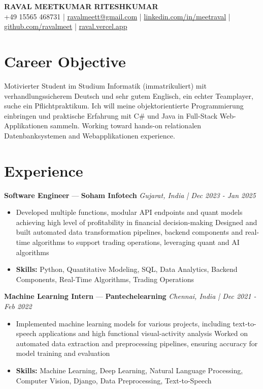 \documentclass[a4paper,10pt]{article}
\begin{document}
\begin{center}
  {\Large\bfseries RAVAL MEETKUMAR RITESHKUMAR}\\[2pt]
  {\small +49 15565 468731 \;|\; \href{mailto:ravalmeett@gmail.com}{ravalmeett@gmail.com} \;|\; \href{https://www.linkedin.com/in/meetraval/}{linkedin.com/in/meetraval} \;|\; \href{https://github.com/ravalmeet}{github.com/ravalmeet} \;|\; \href{https://raval.vercel.app/}{raval.vercel.app}}
\end{center}
\vspace{-3pt}

\section*{Career Objective}
Motivierter Student im Studium Informatik (immatrikuliert) mit verhandlungssicherem Deutsch und sehr gutem Englisch, ein echter Teamplayer, suche ein Pflichtpraktikum. Ich will meine objektorientierte Programmierung einbringen und praktische Erfahrung mit C\# und Java in Full-Stack Web-Applikationen sammeln. Working toward hands-on relationalen Datenbanksystemen and Webapplikationen experience.\par

\section*{Experience}
\textbf{Software Engineer} — \textbf{Soham Infotech} \hfill \textit{Gujarat, India \;|\; Dec 2023 - Jan 2025}\par
\vspace{1pt}
\begin{itemize}
  \item Developed multiple functions, modular API endpoints and quant models achieving high level of profitability in financial decision-making Designed and built automated data transformation pipelines, backend components and real-time algorithms to support trading operations, leveraging quant and AI algorithms
  \item \textbf{Skills:} Python, Quantitative Modeling, SQL, Data Analytics, Backend Components, Real-Time Algorithms, Trading Operations
\end{itemize}
\vspace{3pt}
\textbf{Machine Learning Intern} — \textbf{Pantechelearning} \hfill \textit{Chennai, India \;|\; Dec 2021 - Feb 2022}\par
\vspace{1pt}
\begin{itemize}
  \item Implemented machine learning models for various projects, including text-to-speech applications and high functional visual-activity analysis Worked on automated data extraction and preprocessing pipelines, ensuring accuracy for model training and evaluation
  \item \textbf{Skills:} Machine Learning, Deep Learning, Natural Language Processing, Computer Vision, Django, Data Preprocessing, Text-to-Speech
\end{itemize}
\end{document}
